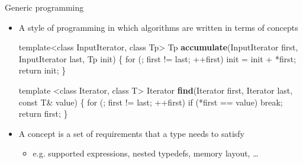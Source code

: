 \begin{frame}[fragile]{Generic programming}

  \begin{itemize}
  \item A style of programming in which \alert{algorithms} are written
    in terms of \alert{concepts}

    \begin{codeblock}
template<class InputIterator, class Tp>
Tp \textbf{accumulate}(InputIterator first, InputIterator last, Tp init)
\{
    for (; first \alert{!=} last; \alert{++}first)
        init \alert{=} init \alert{+} \alert{*}first;
    return init;
\}\end{codeblock}

  \begin{codeblock}
template <class Iterator, class T>
Iterator \textbf{find}(Iterator first, Iterator last, const T\& value)
\{
  for (; first \alert{!=} last; \alert{++}first)
    if (\alert{*}first \alert{==} value) break;
  return first;
\}\end{codeblock}

  \item A concept is a set of requirements that a type needs to satisfy
    \begin{itemize}
    \item e.g. supported expressions, nested typedefs, memory layout, \ldots
    \end{itemize}
  \end{itemize}

\end{frame}


